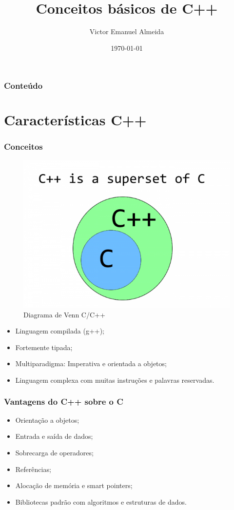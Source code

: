 \documentclass[12pt]{beamer}
\author{Victor Emanuel Almeida}
\title{Conceitos básicos de C++}
\date{\today}
\institute{UNIOESTE}
\begin{document}
\frame{\titlepage}

\begin{frame}
    \frametitle{Conteúdo}
    \tableofcontents
\end{frame}

\section{Características C++}\label{Características C++}
\begin{frame}[allowframebreaks]
    \frametitle{Conceitos}
    \begin{figure}[!htb]
        \centering
        \includegraphics[width=.7\textwidth]{superset}
        \caption{\label{fig:superset}Diagrama de Venn C/C++}
    \end{figure}
    \framebreak
    \begin{itemize}
        \item Linguagem compilada (g++);
        \item Fortemente tipada\cite{slides_clp_2};
        \item Multiparadigma: Imperativa e orientada a objetos\cite{slides_clp_2};
        \item Linguagem complexa com muitas instruções e palavras reservadas\cite{slides_clp_2}.
    \end{itemize}
\end{frame}

\begin{frame}
    \frametitle{Vantagens do C++ sobre o C}
    \begin{itemize}
        \item Orientação a objetos;
        \item Entrada e saída de dados;
        \item Sobrecarga de operadores;
        \item Referências;
        \item Alocação de memória e smart pointers;
        \item Bibliotecas padrão com algoritmos e estruturas de dados.
    \end{itemize}
\end{frame}
\end{document}
